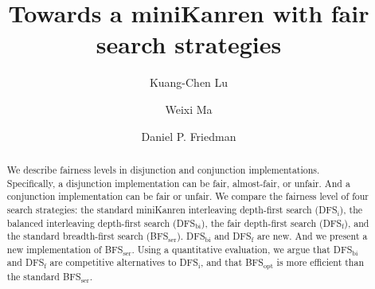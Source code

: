 \documentclass[format=acmlarge, review=true, authordraft=true]{acmart}
\title{Towards a miniKanren with fair search strategies}
\author{Kuang-Chen Lu}
\affiliation{Indiana University}
\author{Weixi Ma}
\affiliation{Indiana University}
\author{Daniel P. Friedman}
\affiliation{Indiana University}
\newcommand{\conde}{\texttt{cond$^e$}}
\newcommand{\conj}{\texttt{conj}}
\newcommand{\disj}{\texttt{disj}}
\newcommand{\DFSi }[0]{DFS$_\textrm{i}$}
\newcommand{\DFSf }[0]{DFS$_\textrm{f}$}
\newcommand{\DFSbi}[0]{DFS$_\textrm{bi}$}
\newcommand{\BFSopt}[0]{BFS$_\textrm{opt}$}
\newcommand{\BFSser}[0]{BFS$_\textrm{ser}$}
\begin{document}

\begin{abstract}

  We describe fairness levels in disjunction and conjunction
  implementations.  Specifically, a disjunction implementation can be
  fair, almost-fair, or unfair. And a conjunction implementation can
  be fair or unfair.  We compare the fairness level of four search
  strategies: the standard miniKanren interleaving depth-first search (\DFSi),
  the balanced interleaving depth-first search (\DFSbi), the fair depth-first
  search (\DFSf), and the standard breadth-first search (\BFSser).  
  \DFSbi{} and \DFSf{} are new. And we present a new implementation of 
  \BFSser. Using a quantitative evaluation, we argue that
  \DFSbi{} and \DFSf{} are competitive alternatives to \DFSi, 
  and that \BFSopt{} is more efficient than the standard \BFSser.

% 


\end{abstract}

\maketitle
\end{document}
